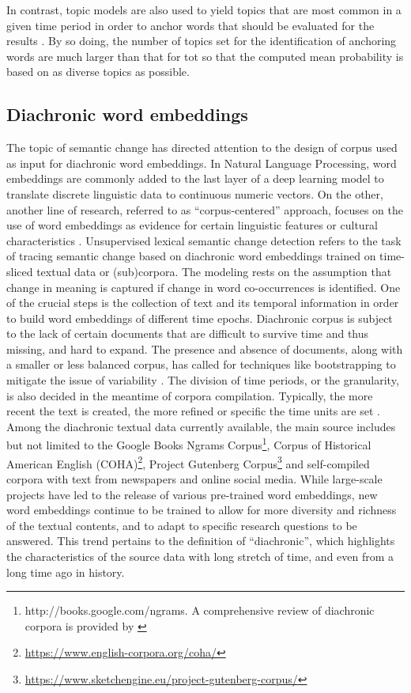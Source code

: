 In contrast, topic models are also used to yield topics that are most common in a given time period in order to anchor words that should be evaluated for the results \parencite{antoniak2018evaluating}. By so doing, the number of topics set for the identification of anchoring words are much larger than that for \gls{tot} so that the computed mean probability is based on as diverse topics as possible.

\subsection{Diachronic word embeddings}
The topic of semantic change has directed attention to the design of corpus used as input for diachronic word embeddings. In Natural Language Processing, word embeddings are commonly added to the last layer of a deep learning model to translate discrete linguistic data to continuous numeric vectors. On the other, another line of research, referred to as ``corpus-centered'' approach, focuses on the use of word embeddings as evidence for certain linguistic features or cultural characteristics \parencite{antoniak2018evaluating}. Unsupervised lexical semantic change detection refers to the task of tracing semantic change based on diachronic word embeddings trained on time-sliced textual data or (sub)corpora. The modeling rests on the assumption that change in meaning is captured if change in word co-occurrences is identified. One of the crucial steps is the collection of text and its temporal information in order to build word embeddings of different time epochs. Diachronic corpus is subject to the lack of certain documents that are difficult to survive time and thus missing, and hard to expand. The presence and absence of documents, along with a smaller or less balanced corpus, has called for techniques like bootstrapping to mitigate the issue of variability \parencite{antoniak2018evaluating}.  The division of time periods, or the granularity, is also decided in the meantime of corpora compilation. Typically, the more recent the text is created, the more refined or specific the time units are set \parencite{kutuzov2018survey}. Among the diachronic textual data currently available, the main source includes but not limited to the Google Books Ngrams Corpus\footnote{http://books.google.com/ngrams. A comprehensive review of diachronic corpora is provided by \textcite[38--41]{tahmasebi2018survey}}, Corpus of Historical American English (COHA)\footnote{\url{https://www.english-corpora.org/coha/}}, Project Gutenberg Corpus\footnote{\url{https://www.sketchengine.eu/project-gutenberg-corpus/}} and self-compiled corpora with text from newspapers and online social media. While large-scale projects have led to the release of various pre-trained word embeddings, new word embeddings continue to be trained to allow for more diversity and richness of the textual contents, and to adapt to specific research questions to be answered. This trend pertains to the definition of ``diachronic'', which highlights the characteristics of the source data with long stretch of time, and even from a long time ago in history.

